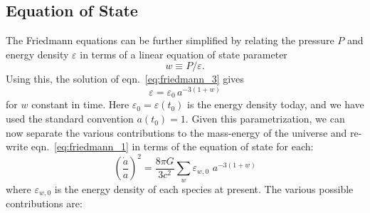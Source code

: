 \subsection{Equation of State}
The Friedmann equations can be further simplified
by relating the pressure $P$ and energy
density $\varepsilon$ in terms of a linear equation of state parameter
\begin{equation}
  \label{eq:w_EOS}
  w \equiv P / \varepsilon.
\end{equation}
Using this, the solution of eqn.~\ref{eq:friedmann_3} gives
\begin{equation}
  \label{eq:w_constant}
  \varepsilon = \varepsilon_0\, a^{-3(1 + w)}
\end{equation}
for $w$ constant in time.
Here $\varepsilon_0 = \varepsilon(t_0)$ is the energy density today,
and we have used the standard convention $a(t_0) = 1$.
Given this parametrization, we can now
separate the various contributions to the mass-energy of the universe
and re-write eqn.~\ref{eq:friedmann_1} in terms of the equation of
state for each:
\begin{equation}
  \label{eq:friedmann_1_split}
  \left(\frac{\dot{a}}{a}\right)^2 = \frac{8\pi G}{3c^2}
  \sum_w \varepsilon_{w, 0} \,\, a^{-3(1 + w)}
\end{equation}
where $\varepsilon_{w,0}$ is the energy density of each species at present.
The various possible contributions are:
